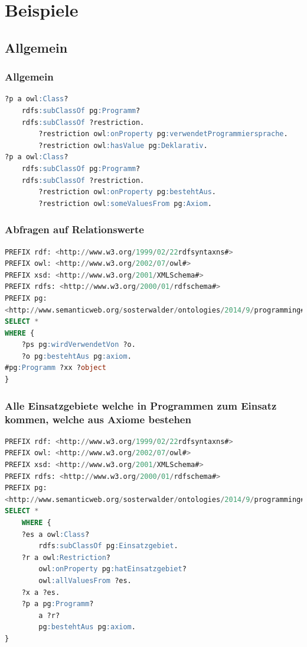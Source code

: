 \chapter{Beispiele}
\label{chap:anh_beispiele}


\section{Allgemein}
\label{sec:anh_beispiel_1}
\subsection{Allgemein}
\label{ssec:anh_beispiel_a_1}

\begin{lstlisting}[caption={Abfragen auf Relationswerte},captionpos=b,language=SQL]
?p a owl:Class?
	rdfs:subClassOf pg:Programm?
	rdfs:subClassOf ?restriction.
		?restriction owl:onProperty pg:verwendetProgrammiersprache.
		?restriction owl:hasValue pg:Deklarativ.
?p a owl:Class?
	rdfs:subClassOf pg:Programm?
	rdfs:subClassOf ?restriction.
		?restriction owl:onProperty pg:bestehtAus.
		?restriction owl:someValuesFrom pg:Axiom.
\end{lstlisting}

\subsection{Abfragen auf Relationswerte}
\label{ssec:anh_beispiel_a_2}

\begin{lstlisting}[caption={Alle Programmiersprachen, welche von einem Programm
verwendet werden, welches aus Axiomen besteht},captionpos=b,language=SQL]
PREFIX rdf: <http://www.w3.org/1999/02/22rdfsyntaxns#>
PREFIX owl: <http://www.w3.org/2002/07/owl#>
PREFIX xsd: <http://www.w3.org/2001/XMLSchema#>
PREFIX rdfs: <http://www.w3.org/2000/01/rdfschema#>
PREFIX pg:
<http://www.semanticweb.org/sosterwalder/ontologies/2014/9/programming#>
SELECT *
WHERE {
	?ps pg:wirdVerwendetVon ?o.
	?o pg:bestehtAus pg:axiom.
#pg:Programm ?xx ?object
}
\end{lstlisting}


\subsection{Alle Einsatzgebiete welche in Programmen zum Einsatz kommen,
welche aus Axiome bestehen}
\label{ssec:anh_beispiel_a_3}

\begin{lstlisting}[caption={Alle Einsatzgebiete welche in Programmen zum Einsatz kommen,
welche aus Axiome bestehen},captionpos=b,language=SQL]
PREFIX rdf: <http://www.w3.org/1999/02/22rdfsyntaxns#>
PREFIX owl: <http://www.w3.org/2002/07/owl#>
PREFIX xsd: <http://www.w3.org/2001/XMLSchema#>
PREFIX rdfs: <http://www.w3.org/2000/01/rdfschema#>
PREFIX pg: 
<http://www.semanticweb.org/sosterwalder/ontologies/2014/9/programming#>
SELECT *
	WHERE {
	?es a owl:Class?
		rdfs:subClassOf pg:Einsatzgebiet.
	?r a owl:Restriction?
		owl:onProperty pg:hatEinsatzgebiet?
		owl:allValuesFrom ?es.
	?x a ?es.
	?p a pg:Programm?
		a ?r?
		pg:bestehtAus pg:axiom.
}
\end{lstlisting}

